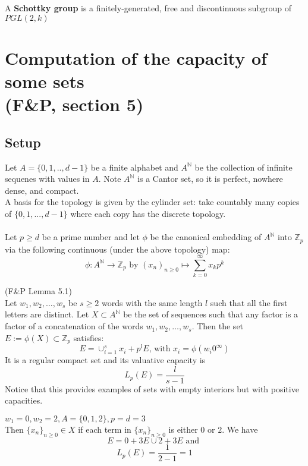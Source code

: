 \begin{definition*} \cite{gvdp} A \textbf{Schottky group} is a finitely-generated, free and discontinuous subgroup of  $PGL(2,k)$
\end{definition*}




\section*{Computation of the capacity of some sets\\ (F\&P, section 5)}
\subsection*{Setup}
Let $A=\{0,1,..,d-1\}$ be a finite alphabet and $A^{\mathbb{N}}$ be the collection of infinite sequenes with values in $A$. Note $A^{\mathbb{N}}$ is a Cantor set, so it is perfect, nowhere dense, and compact.  \\

A basis for the topology is given by the cylinder set: take countably many copies of $\{0,1,...,d-1\}$ where each copy has the discrete topology.\\\\ Let $p \geq d$ be a prime number and let $\phi$ be the canonical embedding of $A^\mathbb{N}$ into $\mathbb{Z}_p$ via the following continuous (under the above topology) map: \[ \phi: A^{\mathbb{N}} \rightarrow \mathbb{Z}_p \text{ by } (x_n)_{n\geq0} \mapsto \sum_{k=0}^\infty x_kp^k\]

\begin{lemma*} (F\&P Lemma 5.1)\\ Let $w_1,w_2,\ldots,w_s$ be $s\geq 2$ words with the same length $l$ such that all the first letters are distinct. Let $X \subset A^{\mathbb{N}}$ be the set of sequences such that any factor is a factor of a concatenation of the words $w_1,w_2,\ldots,w_s$. Then the set $E := \phi(X) \subset \mathbb{Z}_p$ satisfies: \[E=\cup_{i=1}^s x_i +p^l E \text{,   with } x_i=\phi(w_i0^\infty)\]
It is a regular compact set and its valuative capacity is \[L_p(E) = \frac{l}{s-1}\] Notice that this provides examples of sets with empty interiors but with positive capacities.
\end{lemma*}
\begin{example}
	$w_1=0, w_2=2,  A=\{0,1,2\}, p=d=3$\\
	Then $\{x_n\}_{n\geq0} \in X$ if each term in  $\{x_n\}_{n\geq0}$ is either $0$ or $2$. We have \[E=0 + 3E \cup 2 + 3E \text{ and }\]  \[L_p(E) = \frac{1}{2-1} =1\] 
\end{example}

